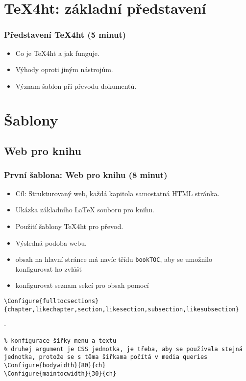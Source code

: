 \documentclass{beamer}
\begin{document}
\section{TeX4ht: základní představení}
\begin{frame}
\frametitle{Představení TeX4ht (5 minut)}
\begin{itemize}
    \item Co je TeX4ht a jak funguje.
    \item Výhody oproti jiným nástrojům.
    \item Význam šablon při převodu dokumentů.
\end{itemize}
\end{frame}

\section{Šablony}

\subsection{Web pro knihu}
\begin{frame}
\frametitle{První šablona: Web pro knihu (8 minut)}
\begin{itemize}
    \item Cíl: Strukturovaný web, každá kapitola samostatná HTML stránka.
    \item Ukázka základního LaTeX souboru pro knihu.
    \item Použití šablony TeX4ht pro převod.
    \item Výsledná podoba webu.
\end{itemize}
\end{frame}

\begin{frame}[fragile]
\begin{itemize}
  \item obsah na hlavní stránce má navíc třídu \verb|bookTOC|, aby se umožnilo konfigurovat ho zvlášť
  \item konfigurovat seznam sekcí pro obsah pomocí 
\end{itemize}
\begin{verbatim}
\Configure{fulltocsections}{chapter,likechapter,section,likesection,subsection,likesubsection}
\end{verbatim}
\end{frame}

- 

\begin{verbatim}
% konfigurace šířky menu a textu
% druhej argument je CSS jednotka, je třeba, aby se používala stejná jednotka, protože se s těma šířkama počítá v media queries
\Configure{bodywidth}{80}{ch}
\Configure{maintocwidth}{30}{ch}
\end{verbatim}
\end{document}
